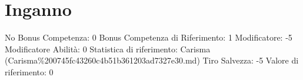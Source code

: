\section{Inganno}\label{inganno}

\begin{description}
\tightlist
\item[Tags: ABI]
No Bonus Competenza: 0 Bonus Competenza di Riferimento: 1 Modificatore:
-5 Modificatore Abilità: 0 Statistica di riferimento: Carisma
(Carisma\%200745fc43260c4b51b361203ad7327e30.md) Tiro Salvezza: -5
Valore di riferimento: 0
\end{description}
